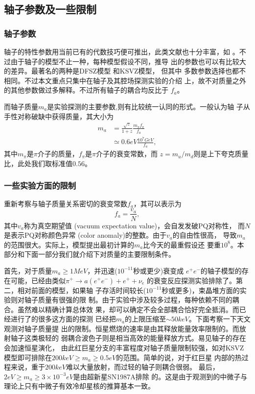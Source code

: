 \documentclass[twocolumn,12pt,a4paper]{article}
\begin{document}
\subsection{轴子参数及一些限制}
\subsubsection{轴子参数}
轴子的特性参数用当前已有的代数技巧便可推出，此类文献也十分丰富，如
\cite{weinberg78}。不过由于轴子的模型不止一种，每种模型假设不同，推导
出的参数也可以有比较大的差异。最著名的两种是DFSZ模型
\cite{zhitnitsky80}\cite{dine81}和KSVZ模型\cite{kim79}\cite{shifman80}，
但其中
多数参数选择也都不相同。不过本文重点只集中在轴子及其腔场探测实验的介绍
上，故不对质量之外的其他参数做过多解释。不过所有轴子的耦合均反比于
$f_a$。\par
而轴子质量$m_a$是实验探测的主要参数,则有比较统一认同的形式。一般认为轴
子从手性对称破缺中获得质量，其大小为
\begin{equation}
  \begin{split}
    m_a &= \frac{\sqrt{z}}{1+z}\frac{m_{\pi}f_{\pi}}{f_a} \\
        &\simeq 0.6 eV \frac{10^7GeV}{f_a},
  \end{split}
  \label{m:mass}
\end{equation}
其中$m_{\pi}$是$\pi$介子的质量，$f_{\pi}$是$\pi$介子的衰变常数，而
$z=m_u/m_d$则是上下夸克质量比，此处我们取标准值$0.56$。
\subsubsection{一些实验方面的限制}
\label{econstrs}
重新考察与轴子质量关系密切的衰变常数$f_a$，其可以表示为
\begin{equation}
  f_a = \frac{v_a}{N},
  \label{m:fa}
\end{equation}
其中$v_a$称为真空期望值 (vacuum expectation value)，会自发发破PQ对称性，
而$N$是表示PQ对称颜色异常 (color anomaly)的整数。由于$v_a$的自由性很高，
导致$m_a$的范围很大。实际上，模型提出最初计算的$m_a$比今天的最重假设还
要重$10^8$。本部分和下面一部分我们就介绍下对质量的主要限制条件。\par
首先，对于质量$m_a \geq 1MeV$，并迅速($10^{-11}$秒或更少)衰变成
$e^+e^-$的轴子模型的存在可能，已经由类似$\pi^+ \rightarrow a(e^+ e^-)+e^++\nu_e$
的衰变反应探测实验排除了\cite{eichler86}。第二，相对前面的模型，如果轴
子存活时间较长($10^{-11}$秒或更多)，束晶堆方面的实验则对轴子质量有很强的限
制。由于实验中涉及较多过程，每种依赖不同的耦合。虽然难以精确计算总体效
果，却可以确定不会全部耦合恰好完全抵消。而已经进行了的很多这方面的探测\cite{pdg98}
已经把$m_a$的上限压缩至$\sim 50 keV$。下面考察一下天文观测对轴子质量提
出的限制。恒星燃烧的速率是由其释放能量效率限制的。而放射轴子这类极轻的
弱耦合波色子则是相当高效的能量释放方式。易见轴子的存在会加速恒星演化，
由此红巨星分支的丰富程度对轴子质量限制较强，如对KSVZ模型即可排除在$200keV
\geq m_a \geq 0.5eV$的范围\cite{raffelt87}。简单的说，对于红巨星
内部的热过程来说，重于$200keV$难以大量放射，而过轻的轴子则耦合很弱。
最后，$2eV \geq m_a \geq 3\times 10^{-3}eV$是由超新星SN1987A排除
的。这是由于观测到的中微子与理论上只有中微子有效冷却星核的推算基本一致。
\end{document}
